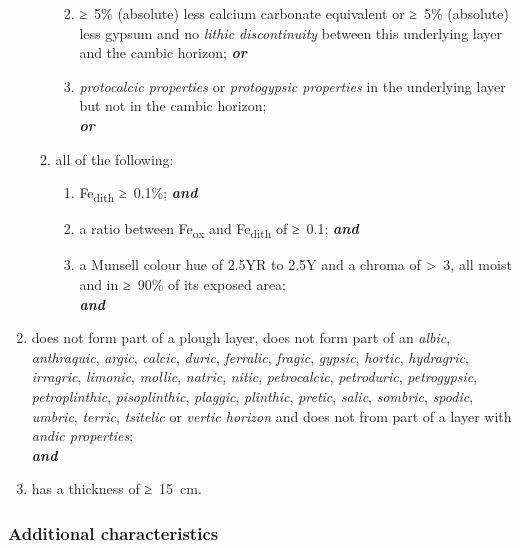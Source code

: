 \documentclass[
  letterpaper,
  DIV=11,
  numbers=noendperiod]{scrreprt}
\providecommand{\tightlist}{%
  \setlength{\itemsep}{0pt}\setlength{\parskip}{0pt}}\usepackage{longtable,booktabs,array}
\begin{document}
\begin{enumerate}
\begin{enumerate}
    \begin{enumerate}
    \def\labelenumiii{\roman{enumiii}.}
    \tightlist
    \item
      ≥~5\% (absolute) less calcium carbonate equivalent or ≥~5\%
      (absolute) less gypsum and no \emph{lithic discontinuity} between
      this underlying layer and the cambic horizon; \textbf{\emph{or}}
    \item
      \emph{protocalcic properties} or \emph{protogypsic properties} in
      the underlying layer but not in the cambic horizon;\\
      \textbf{\emph{or}}
    \end{enumerate}
  \item
    all of the following:

    \begin{enumerate}
    \def\labelenumiii{\roman{enumiii}.}
    \tightlist
    \item
      Fe\textsubscript{dith} ≥~0.1\%; \textbf{\emph{and}}
    \item
      a ratio between Fe\textsubscript{ox} and Fe\textsubscript{dith} of
      ≥~0.1; \textbf{\emph{and}}
    \item
      a Munsell colour hue of 2.5YR to 2.5Y and a chroma of
      \textgreater~3, all moist and in ≥~90\% of its exposed area;\\
      \textbf{\emph{and}}
    \end{enumerate}
  \end{enumerate}
\item
  does not form part of a plough layer, does not form part of an
  \emph{albic}, \emph{anthraquic}, \emph{argic}, \emph{calcic},
  \emph{duric}, \emph{ferralic}, \emph{fragic}, \emph{gypsic},
  \emph{hortic}, \emph{hydragric}, \emph{irragric}, \emph{limonic},
  \emph{mollic}, \emph{natric}, \emph{nitic}, \emph{petrocalcic},
  \emph{petroduric}, \emph{petrogypsic}, \emph{petroplinthic},
  \emph{pisoplinthic}, \emph{plaggic}, \emph{plinthic}, \emph{pretic},
  \emph{salic}, \emph{sombric}, \emph{spodic}, \emph{umbric},
  \emph{terric}, \emph{tsitelic} or \emph{vertic horizon} and does not
  from part of a layer with \emph{andic properties};\\
  \textbf{\emph{and}}
\item
  has a thickness of ≥~15~cm.
\end{enumerate}

\hypertarget{additional-characteristics}{%
\subsubsection{Additional
characteristics}\label{additional-characteristics}}
\end{document}

